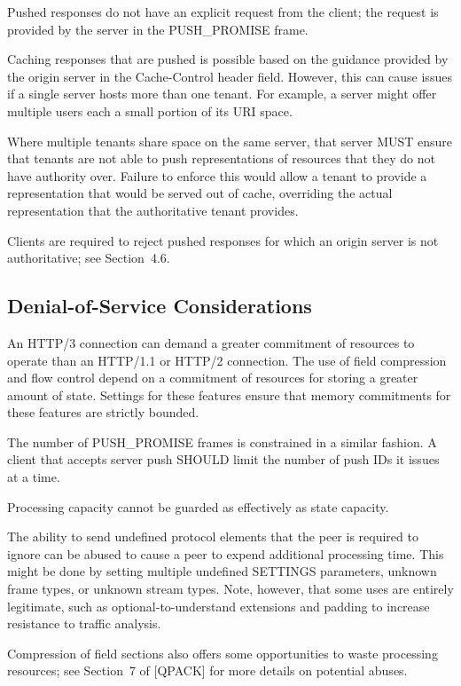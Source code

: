 \documentclass{article}
\begin{document}
Pushed responses do not have an explicit request from the client; the request is provided by the server in the PUSH\_PROMISE frame.

Caching responses that are pushed is possible based on the guidance provided by the origin server in the Cache-Control header field. However, this can cause issues if a single server hosts more than one tenant.  For example, a server might offer multiple users each a small portion of its URI space.

Where multiple tenants share space on the same server, that server MUST ensure that tenants are not able to push representations of resources that they do not have authority over.  Failure to enforce this would allow a tenant to provide a representation that would be served out of cache, overriding the actual representation that the authoritative tenant provides.

Clients are required to reject pushed responses for which an origin server is not authoritative; see Section~4.6.

\subsection{Denial-of-Service Considerations}

An HTTP/3 connection can demand a greater commitment of resources to operate than an HTTP/1.1 or HTTP/2 connection.  The use of field compression and flow control depend on a commitment of resources for storing a greater amount of state.  Settings for these features ensure that memory commitments for these features are strictly bounded.

The number of PUSH\_PROMISE frames is constrained in a similar fashion.  A client that accepts server push SHOULD limit the number of push IDs it issues at a time.

Processing capacity cannot be guarded as effectively as state capacity.

The ability to send undefined protocol elements that the peer is required to ignore can be abused to cause a peer to expend additional processing time.  This might be done by setting multiple undefined SETTINGS parameters, unknown frame types, or unknown stream types. Note, however, that some uses are entirely legitimate, such as optional-to-understand extensions and padding to increase resistance to traffic analysis.

Compression of field sections also offers some opportunities to waste processing resources; see Section~7 of [QPACK] for more details on potential abuses.
\end{document}
